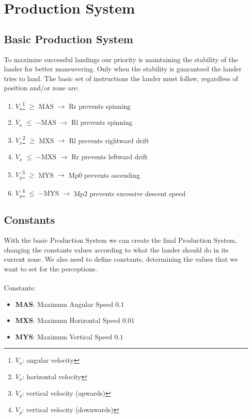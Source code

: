 \documentclass{article}
\begin{document}
\section{Production System}

\subsection{Basic Production System}
To maximize successful landings our priority is maintaining the stability of the lander for better maneuvering. Only when the stability is guaranteed the lander tries to land. The basic set of instructions the lander must follow, regardless of position and/or zone are:

\begin{enumerate}
    \item $V_a$\footnote{$V_a$: angular velocity} $\geq$ MAS $\rightarrow$ Rr \hfill prevents spinning
    \item $V_a$ $\leq$ $-\text{MAS}$ $\rightarrow$ Rl \hfill prevents spinning
    \item $V_x$\footnote{$V_x$: horizontal velocity} $\geq$ MXS $\rightarrow$ Rl \hfill prevents rightward drift
    \item $V_x$ $\leq$ $-\text{MXS}$ $\rightarrow$ Rr \hfill prevents leftward drift
    \item $V_y$\footnote{$V_y$: vertical velocity (upwards)} $\geq$ MYS $\rightarrow$ Mp0 \hfill prevents ascending
    \item $V_y$\footnote{$V_y$: vertical velocity (downwards)} $\leq$ $-\text{MYS}$ $\rightarrow$ Mp2 \hfill prevents excessive descent speed
\end{enumerate}

\subsection{Constants}
With the basic Production System we can create the final Production System, changing the constants values according to what the lander should do in its current zone. We also need to define constants, determining the values that we want to set for the perceptions.
\noindent \\ \\ Constants:
\begin{itemize}
    \item \textbf{MAS}: Maximum Angular Speed \hfill $0.1$
    \item \textbf{MXS}: Maximum Horizontal Speed \hfill $0.01$
    \item \textbf{MYS}: Maximum Vertical Speed \hfill $0.1$
\end{itemize}
\end{document}

